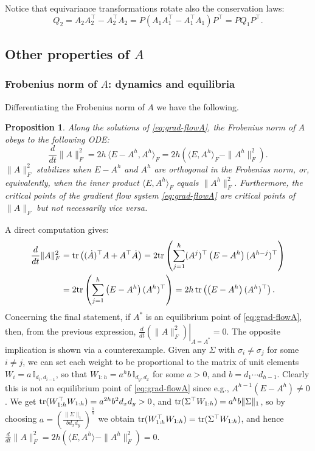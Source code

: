 \documentclass{article}
\makeatletter
\renewenvironment{proof}[1][\proofname]{
  \par\pushQED{\qed}\normalfont
  \topsep6\p@\@plus6\p@\relax
  \trivlist\item[\hskip\labelsep\bfseries#1\@addpunct{.}]
  \ignorespaces
}{
  \popQED\endtrivlist\@endpefalse
}
\newtheorem{proposition}{Proposition}
\def\tr{{\rm tr}}
\newcommand{\1}{\mathds{1}}
\makeatother
\begin{document}
Notice that equivariance transformations rotate also the conservation laws: $$ 
 Q_2 = A_2 A_2^\top - A_2^\top A_2 =  P ( A_1 A_1^\top - A_1^\top A_1 ) P^\top = P  Q_1 P^\top .$$



\subsection{Other properties of $A$}

\subsubsection{Frobenius norm of $A$: dynamics and equilibria}

Differentiating the Frobenius norm of $A$ we have the following.
\begin{proposition}
\label{prop:FrobA}
Along the solutions of \eqref{eq:grad-flowA}, the Frobenius norm of $A$ obeys to the following ODE:
\begin{equation}
    \label{eq:dotFrobA}
\frac{d}{dt} \| A\|_F^2  = 2h \, \bigl \langle E - A^h, A^h \bigr \rangle_F = 2h \left( \bigl \langle E , A^h \bigr \rangle_F - \| A^h\|_F^2 \right).
\end{equation}
$  \| A\|_F^2 $ stabilizes when $ E-A^h $ and $A^h $ are orthogonal in the Frobenius norm, or, equivalently, when the inner product $  \bigl \langle E , A^h \bigr \rangle_F $ equals $  \| A^h\|_F^2$.
Furthermore, the critical points of the gradient flow system \eqref{eq:grad-flowA} are critical points of  $  \| A\|_F $ but not necessarily vice versa.
\end{proposition}
\begin{proof}
A direct computation gives:
\begin{align*}
 \frac{d}{dt} \| A\|_F^2 & = \tr \left( (\dot{A})^\top A + A^\top \dot A \right) = 2 \tr \left( \sum_{j=1}^h (A^{j})^\top \left( E - A^h \right)( A^{h-j})^\top \right) \\
 & = 2 \tr \left( \sum_{j=1}^h \left( E - A^h \right)( A^{h})^\top \right) = 2h \, \tr \left( \left( E - A^h \right)( A^{h})^\top \right) .
\end{align*}
Concerning the final statement, if $A^\ast $ is an equilibrium point of \eqref{eq:grad-flowA}, then, from the previous expression, $   \frac{d}{dt} \left. \left( \| A\|_F^2 \right) \right|_{A=A^\ast} =0 $. The opposite implication is shown via a counterexample. Given any $\Sigma$ with $\sigma_i\neq\sigma_j$ for some $i\neq j$, we can set each weight to be proportional to the matrix of unit elements $W_i= a \, \mathbb{I}_{d_i, d_{i-1}}$, so that $W_{1:h}=a^hb \,\mathbb{I}_{d_y, d_x}$ for some $a>0$, and $b=d_1\cdots d_{h-1}$. Clearly this is not an equilibrium point of \eqref{eq:grad-flowA} since e.g., $A^{h-1}(E-A^h)\neq0$.
We get $\tr(W_{1:h}^\top W_{1:h})=a^{2h}b^2d_x d_y>0$, and $\tr( \Sigma^\top W_{1:h})=a^hb\lVert\Sigma\rVert_1 $, so by choosing  $ a = \left( \frac{ \lVert \Sigma \rVert_1 }{ b d_x d_y } \right)^\frac{ 1 }{ h }$ we obtain $\tr(W_{1:h}^\top W_{1:h})=\tr( \Sigma^\top W_{1:h})$, and hence $\frac{d}{dt} \| A\|_F^2=2h \left( \bigl \langle E , A^h \bigr \rangle - \| A^h\|_F^2 \right)=0$.
\end{proof}
\end{document}
